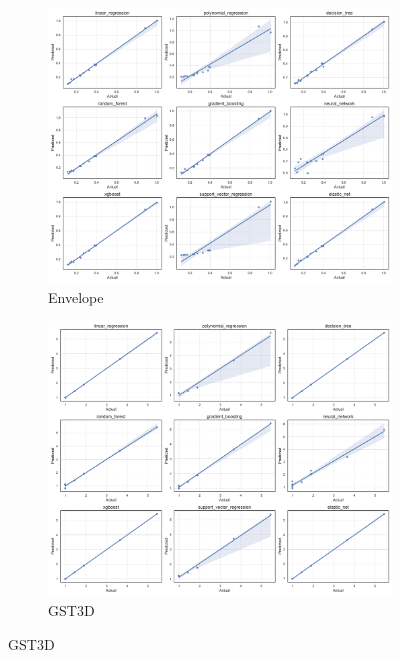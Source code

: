 \begin{figure}[htbp]
    \centering
    \begin{subfigure}[t]{0.32\textwidth}
        \includegraphics[width=\textwidth]{assets/images/05/actual_vs_predicted_by_model_envelope}
        \caption{Envelope}
    \end{subfigure}
    \hfill
    \begin{subfigure}[t]{0.32\textwidth}
        \includegraphics[width=\textwidth]{assets/images/05/actual_vs_predicted_by_model_gst3d}
        \caption{\ac{GST3D}}
    \end{subfigure}
    \hfill

\end{figure}
